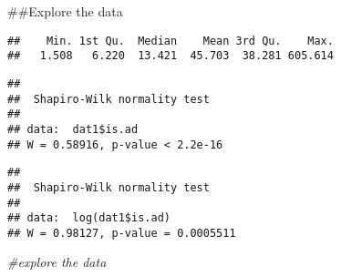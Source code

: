 \documentclass[12pt,]{article}
\newenvironment{Shaded}{\begin{snugshade}}{\end{snugshade}}
\newcommand{\CommentTok}[1]{\textcolor[rgb]{0.56,0.35,0.01}{\textit{#1}}}
\newcommand{\DecValTok}[1]{\textcolor[rgb]{0.00,0.00,0.81}{#1}}
\newcommand{\KeywordTok}[1]{\textcolor[rgb]{0.13,0.29,0.53}{\textbf{#1}}}
\newcommand{\NormalTok}[1]{#1}
\newcommand{\OperatorTok}[1]{\textcolor[rgb]{0.81,0.36,0.00}{\textbf{#1}}}
\newcommand{\StringTok}[1]{\textcolor[rgb]{0.31,0.60,0.02}{#1}}
\begin{document}
\#\#Explore the data

\begin{Shaded}
\end{Shaded}

\begin{verbatim}
##    Min. 1st Qu.  Median    Mean 3rd Qu.    Max. 
##   1.508   6.220  13.421  45.703  38.281 605.614
\end{verbatim}

\begin{Shaded}
\end{Shaded}

\begin{verbatim}
## 
##  Shapiro-Wilk normality test
## 
## data:  dat1$is.ad
## W = 0.58916, p-value < 2.2e-16
\end{verbatim}

\begin{Shaded}
\end{Shaded}

\begin{verbatim}
## 
##  Shapiro-Wilk normality test
## 
## data:  log(dat1$is.ad)
## W = 0.98127, p-value = 0.0005511
\end{verbatim}

\begin{Shaded}
\begin{Highlighting}[]
\CommentTok{#explore the data}
\end{Highlighting}
\end{Shaded}
\end{document}
